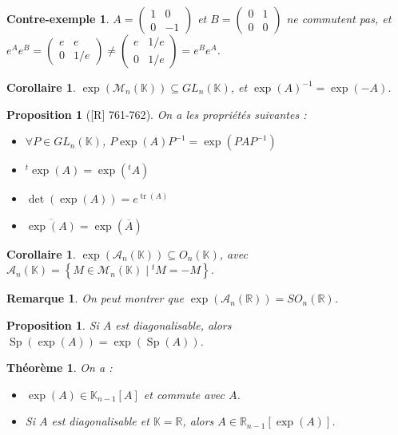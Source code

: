 \documentclass[10pt, a4paper, parskip=full, twoside, twocolumn]{report}
\newtheorem{theorem}[definition]{Théorème}
\newtheorem{proposition}[definition]{Proposition}
\newtheorem{corollary}[definition]{Corollaire}
\newtheorem{cexample}[definition]{Contre-exemple}
\newtheorem{remark}[definition]{Remarque}
\newcommand{\IK}{\mathbb{K}}
\newcommand{\IR}{\mathbb{R}}
\newcommand{\M}{\mathcal{M}}
\DeclareMathOperator{\tr}{tr}
\DeclareMathOperator{\Sp}{Sp}
\begin{document}
\begin{cexample}
	$A = \begin{pmatrix}
		1 & 0 \\ 0 & -1
	\end{pmatrix}$ et $B = \begin{pmatrix}
		0&1\\0&0
	\end{pmatrix}$ ne commutent pas, et $e^A e^B = \begin{pmatrix}
		e&e\\0& 1/e
	\end{pmatrix} \neq \begin{pmatrix}
		e & 1/e \\ 0 & 1/e
	\end{pmatrix} = e^B e^A$.
\end{cexample}

\begin{corollary}
	$\exp(\M_n(\IK)) \subseteq GL_n(\IK)$, et $\exp(A)^{-1} = \exp(-A)$.
\end{corollary}

\begin{proposition}[\textnormal{[R] 761-762}]
	On a les propriétés suivantes :
	\begin{itemize}
		\item $\forall P\in GL_n(\IK)$, $P\exp(A)P^{-1}=\exp(PAP^{-1})$
		\item ${}^t\exp(A) = \exp({}^tA)$
		\item $\det(\exp(A)) = e^{\tr(A)}$
		\item $\overline{\exp(A)} = \exp(\overline{A})$
	\end{itemize}
\end{proposition}

\begin{corollary}
	$\exp(\mathcal{A}_n(\IK)) \subseteq O_n(\IK)$, avec $\mathcal{A}_n(\IK) = \left\{M\in\M_n(\IK)\mid {}^tM = -M\right\}$.
\end{corollary}

\begin{remark}
	On peut montrer que $\exp(\mathcal{A}_n(\IR)) = SO_n(\IR)$.
\end{remark}

\begin{proposition}
	Si $A$ est diagonalisable, alors $\Sp(\exp(A)) = \exp(\Sp(A))$.
\end{proposition}

\begin{theorem}
	On a :
	\begin{itemize}
		\item $\exp(A)\in \IK_{n-1}[A]$ et commute avec $A$.
		\item Si $A$ est diagonalisable et $\IK = \IR$, alors $A\in \IR_{n-1}[\exp(A)]$.
	\end{itemize}
\end{theorem}
\end{document}
